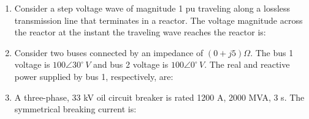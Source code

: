 \documentclass[journal]{IEEEtran}
\numberwithin{equation}{enumi}
\numberwithin{figure}{enumi}
\begin{document}
\begin{enumerate}
    \item Consider a step voltage wave of magnitude 1 pu traveling along a lossless transmission line that terminates in a reactor. The voltage magnitude across the reactor at the instant the traveling wave reaches the reactor is:
    \begin{figure}[!ht]
			\centering
			
			\caption{}
			\label{fig:2}
	\end{figure}

    \begin{enumerate}
	\begin{multicols}{4}
        \item $1$ pu
        \item $1$ pu
        \item $2$ pu
        \item $3$ pu
        \end{multicols}
    \end{enumerate}

    \item Consider two buses connected by an impedance of $(0 + j5) \Omega$. The bus 1 voltage is $100 \angle 30^\circ \, V$ and bus 2 voltage is $100 \angle 0^\circ \, V$. The real and reactive power supplied by bus 1, respectively, are:
    \begin{enumerate}
    \end{enumerate}

    \item A three-phase, 33 kV oil circuit breaker is rated 1200 A, 2000 MVA, 3 s. The symmetrical breaking current is:
    \begin{enumerate}
    \end{enumerate}


\end{enumerate}
\end{document}
